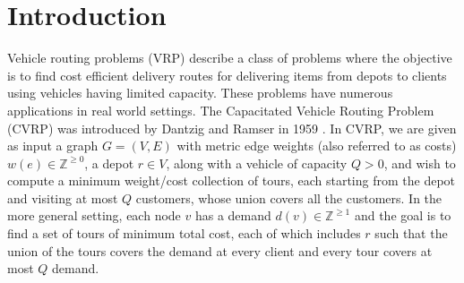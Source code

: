 \documentclass[twoside,leqno]{article}
\begin{document}
\section{Introduction}
Vehicle routing problems (VRP) describe a class of problems where the objective is to find cost efficient delivery routes for delivering items from depots to clients using vehicles having limited capacity. These problems have numerous applications in real world settings. The Capacitated Vehicle Routing Problem (CVRP) was introduced by Dantzig and Ramser in 1959 \cite{Dantzig}. In CVRP, we are given as input a graph $G=(V,E)$ with
metric edge weights (also referred to as costs) $w(e)\in\mathbb{Z}^{\ge 0}$,
a depot $r\in V$, along with a vehicle of capacity $Q>0$, and wish to compute a minimum weight/cost collection of tours, each starting from the depot and visiting at most $Q$ customers, whose union covers all the customers. In the more general setting, each node $v$ has a demand $d(v)\in \mathbb{Z}^{\ge 1}$ and the goal is to find a set of tours of minimum total cost, each of which includes $r$ such that the union of the tours covers the demand at every client and every tour covers at most $Q$ demand. 
\end{document}
